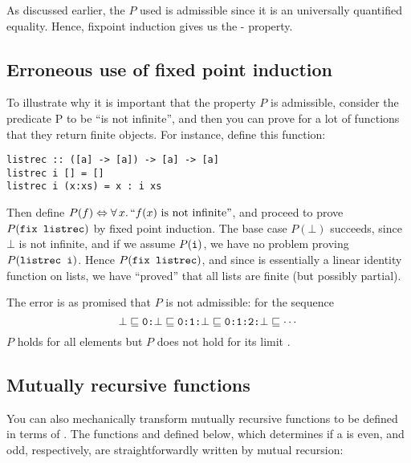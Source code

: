As discussed earlier, the $P$ used is admissible since it is an
universally quantified equality. Hence, fixpoint induction gives us the
- property.

\subsection{Erroneous use of fixed point induction}

To illustrate why it is important that the property $P$ is admissible,
consider the predicate P to be “is not infinite”, and then you can
prove for a lot of functions that they return finite objects. For
instance, define this function:


\begin{verbatim}
listrec :: ([a] -> [a]) -> [a] -> [a]
listrec i [] = []
listrec i (x:xs) = x : i xs
\end{verbatim}

Then define
$P(f) \Leftrightarrow \forall \, x . \, ``f(x) \,\, \mathrm{is \,\, not \,\, infinite}"$,
and proceed to prove $P(\hs{fix listrec})$ by fixed point induction. The
base case $P(\bot)$ succeeds, since $\bot$ is not infinite, and if we
assume $P(\hs{i})$, we have no problem proving $P(\hs{listrec i})$.
Hence $P(\hs{fix listrec})$, and since  is essentially
a linear identity function on lists, we have ``proved'' that all lists
are finite (but possibly partial).

The error is as promised that $P$ is not admissible: for the sequence
\begin{equation*}
\bot \sqsubseteq
\hs{0:}\bot \sqsubseteq
\hs{0:1:}\bot \sqsubseteq
\hs{0:1:2:}\bot \sqsubseteq
\cdots
\end{equation*}
$P$ holds for all elements but $P$ does not hold for its limit \hs{[0..]}.

\subsection{Mutually recursive functions}

You can also mechanically transform mutually recursive functions to be
defined in terms of . The functions  and 
defined below, which determines if a  is even, and odd,
respectively, are straightforwardly written by mutual recursion:

